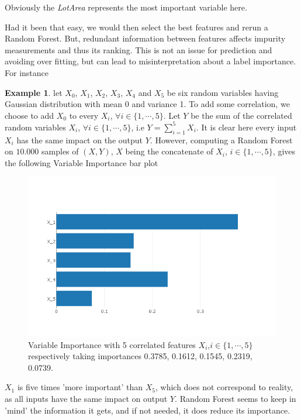 \documentclass[english,11pt,openany]{article}
\theoremstyle{definition}
\theoremstyle{plain}
\theoremstyle{definition}
\newtheorem{Ex}[Th]{Example}
\begin{document}
\begin{appendices}
		Obviously the \textit{LotArea} represents the most important variable here.  
		
		
		
		Had it been that easy, we would then select the best features and rerun a Random Forest. 
		But, redundant information between features affects impurity measurements and thus its ranking. 
		This is not an issue for prediction and avoiding over fitting, but can lead to misinterpretation about a label importance. 
		\newline
		For instance
		
		\begin{Ex}
			let $X_0$, $X_1$, $X_2$,  $X_3$, $X_4$ and $X_5$ be six random variables having Gaussian distribution with mean 0 and variance 1.
			To add some correlation, we choose to add $X_0$ to every $X_i$,  $\forall i \in \{1,\cdots, 5\}$. 
			Let $Y$ be the sum of the correlated random variables $X_i$, $\forall i \in \{1,\cdots, 5\}$, i.e $Y = \sum_{i=1}^{5} X_i$. 
			It is clear here every input $X_i$ has the same impact on the output $Y$. 
			However, computing a Random Forest on $10.000$ samples of $(X, Y)$, $X$ being the concatenate of $X_i$, $i \in \{1,\cdots, 5\}$, gives the following Variable Importance bar plot
			\begin{figure}[H]
				\centering
				\label{figure:vi_ce}
				\includegraphics[scale=0.4]{RF_analysis/vi_contre_example.png} 
				\caption{Variable Importance with 5 correlated features $X_i$,$i \in \{1,\cdots, 5\}$ respectively taking importances 0.3785, 0.1612, 0.1545, 0.2319, 0.0739.}
			\end{figure}
			
			$X_1$ is five times 'more important' than $X_5$, which does not correspond to reality, as all inputs have the same impact on output $Y$. Random Forest seems to keep in 'mind' the information it gets, and if not needed, it does reduce its importance.  
			

\end{Ex}
\end{appendices}
\end{document}
